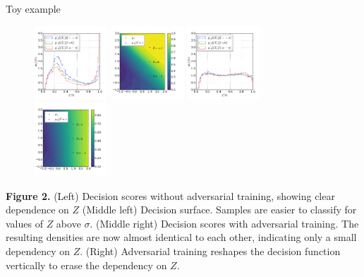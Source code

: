 \documentclass[final,unknownkeysallowed]{beamer}
\begin{document}
\begin{frame}{}
\begin{textblock}{0.32}
\vspace{0.2cm}
\begin{block}{Toy example \phantom{p}}
\begin{figure}
    \begin{center}
        \includegraphics[width=0.245\textwidth]{figures/f-plain.pdf}
        \includegraphics[width=0.245\textwidth]{figures/surface-plain.pdf}
        \includegraphics[width=0.245\textwidth]{figures/f-adversary.pdf}
        \includegraphics[width=0.245\textwidth]{figures/surface-adversary.pdf}
    \end{center}
\end{figure}

{\bf Figure 2.}   (Left) Decision scores
       without adversarial training, showing clear dependence on $Z$
   (Middle left) Decision surface. Samples are easier to classify for values of $Z$ above $\sigma$.
   (Middle right) Decision scores with adversarial training.
      The resulting densities are now almost identical to each other, indicating only a
      small dependency on $Z$.
   (Right) Adversarial
      training reshapes the decision function vertically to erase the dependency on $Z$.


\end{block}
\end{textblock}
\end{frame}
\end{document}
